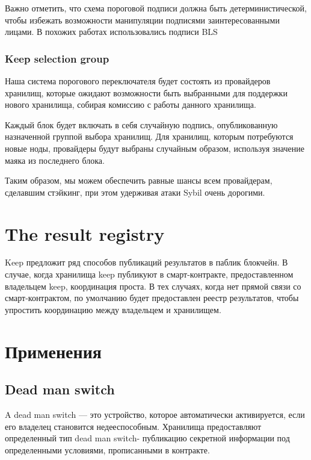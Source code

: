\documentclass[russian,english,11pt]{article}
\begin{document}
Важно отметить, что схема пороговой подписи должна быть 
детерминистической, чтобы избежать возможности манипуляции подписями 
заинтересованными лицами. В похожих работах использовались 
подписи BLS \cite{BLS} 
  
\subsubsection{Keep selection group}

Наша система порогового переключателя будет состоять из провайдеров 
хранилищ, которые ожидают возможности быть выбранными для поддержки 
нового хранилища, собирая комиссию с работы данного хранилища.

Каждый блок будет включать в себя случайную подпись, опубликованную 
назначенной группой выбора хранилищ. Для хранилищ, которым потребуются 
новые ноды, провайдеры будут выбраны случайным образом, используя 
значение маяка из последнего блока. 
  
Таким образом, мы можем обеспечить равные шансы всем провайдерам, 
сделавшим стэйкинг, при этом удерживая атаки Sybil очень дорогими.

\section{The result registry}

Keep предложит ряд способов публикаций результатов в паблик блокчейн. 
В случае, когда хранилища keep публикуют в смарт-контракте, 
предоставленном владельцем keep, координация проста. В тех случаях, 
когда нет прямой связи со смарт-контрактом, по умолчанию будет 
предоставлен реестр результатов, чтобы упростить координацию между 
владельцем и хранилищем.

\section{Применения}
\label{applications}

\subsection{Dead man switch}

A dead man switch — это устройство, которое автоматически активируется, 
если его владелец становится недееспособным. Хранилища предоставляют 
определенный тип dead man switch- публикацию секретной информации под 
определенными условиями, прописанными в контракте. 
\end{document}
